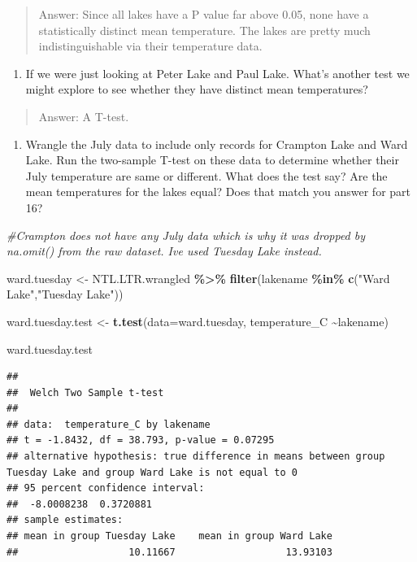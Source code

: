 \documentclass[
]{article}
\newenvironment{Shaded}{\begin{snugshade}}{\end{snugshade}}
\newcommand{\AttributeTok}[1]{\textcolor[rgb]{0.13,0.29,0.53}{#1}}
\newcommand{\CommentTok}[1]{\textcolor[rgb]{0.56,0.35,0.01}{\textit{#1}}}
\newcommand{\FunctionTok}[1]{\textcolor[rgb]{0.13,0.29,0.53}{\textbf{#1}}}
\newcommand{\NormalTok}[1]{#1}
\newcommand{\OtherTok}[1]{\textcolor[rgb]{0.56,0.35,0.01}{#1}}
\newcommand{\SpecialCharTok}[1]{\textcolor[rgb]{0.81,0.36,0.00}{\textbf{#1}}}
\newcommand{\StringTok}[1]{\textcolor[rgb]{0.31,0.60,0.02}{#1}}
\providecommand{\tightlist}{%
  \setlength{\itemsep}{0pt}\setlength{\parskip}{0pt}}
\begin{document}
\begin{quote}
Answer: Since all lakes have a P value far above 0.05, none have a
statistically distinct mean temperature. The lakes are pretty much
indistinguishable via their temperature data.
\end{quote}

\begin{enumerate}
\def\labelenumi{\arabic{enumi}.}
\setcounter{enumi}{16}
\tightlist
\item
  If we were just looking at Peter Lake and Paul Lake. What's another
  test we might explore to see whether they have distinct mean
  temperatures?
\end{enumerate}

\begin{quote}
Answer: A T-test.
\end{quote}

\begin{enumerate}
\def\labelenumi{\arabic{enumi}.}
\setcounter{enumi}{17}
\tightlist
\item
  Wrangle the July data to include only records for Crampton Lake and
  Ward Lake. Run the two-sample T-test on these data to determine
  whether their July temperature are same or different. What does the
  test say? Are the mean temperatures for the lakes equal? Does that
  match you answer for part 16?
\end{enumerate}

\begin{Shaded}
\begin{Highlighting}[]
\CommentTok{\#Crampton does not have any July data which is why it was dropped by na.omit() from the raw dataset. I\textquotesingle{}ve used Tuesday Lake instead. }

\NormalTok{ward.tuesday }\OtherTok{\textless{}{-}}\NormalTok{ NTL.LTR.wrangled }\SpecialCharTok{\%\textgreater{}\%} 
  \FunctionTok{filter}\NormalTok{(lakename }\SpecialCharTok{\%in\%} \FunctionTok{c}\NormalTok{(}\StringTok{"Ward Lake"}\NormalTok{,}\StringTok{"Tuesday Lake"}\NormalTok{))}

\NormalTok{ward.tuesday.test }\OtherTok{\textless{}{-}} \FunctionTok{t.test}\NormalTok{(}\AttributeTok{data=}\NormalTok{ward.tuesday, temperature\_C }\SpecialCharTok{\textasciitilde{}}\NormalTok{lakename)}

\NormalTok{ward.tuesday.test}
\end{Highlighting}
\end{Shaded}

\begin{verbatim}
## 
##  Welch Two Sample t-test
## 
## data:  temperature_C by lakename
## t = -1.8432, df = 38.793, p-value = 0.07295
## alternative hypothesis: true difference in means between group Tuesday Lake and group Ward Lake is not equal to 0
## 95 percent confidence interval:
##  -8.0008238  0.3720881
## sample estimates:
## mean in group Tuesday Lake    mean in group Ward Lake 
##                   10.11667                   13.93103
\end{verbatim}
\end{document}
